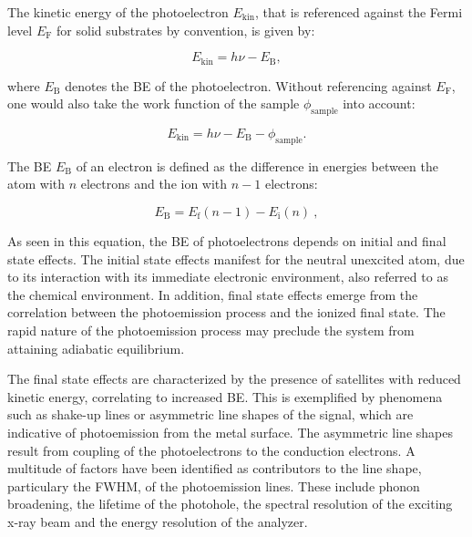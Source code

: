 The kinetic energy of the photoelectron $E_\mathrm{kin}$, that is referenced against the Fermi level $E_\mathrm{F}$ for solid substrates by convention, is given by\autocite{Woodruff2016, Briggs1990}:

\begin{equation}
    \label{eq:KineticEnergy1}
    E_\mathrm{kin} = h\nu - E_\mathrm{B},
\end{equation}

where $E_\mathrm{B}$ denotes the \acf{BE} of the photoelectron. Without referencing against $E_\mathrm{F}$, one would also take the work function of the sample $\phi_\mathrm{sample}$ into account:

\begin{equation}
	\label{eq:KineticEnergy2}
	E_\mathrm{kin} = h\nu - E_\mathrm{B}-\phi_\mathrm{sample}.
\end{equation}

 The \ac{BE} $E_\mathrm{B}$ of an electron is defined as the difference in energies between the atom with $n$ electrons and the ion with $n-1$ electrons:

\begin{equation}
    \label{eq:BindingEnergy}
    E_\mathrm{B}=E_\mathrm{f}(n-1)-E_\mathrm{i}(n)~,
\end{equation}


As seen in this equation, the \ac{BE} of photoelectrons depends on initial and final state effects. The initial state effects manifest for the neutral unexcited atom, due to its interaction with its immediate electronic environment, also referred to as the chemical environment. In addition, final state effects emerge from the correlation between the photoemission process and the ionized final state. The rapid nature of the photoemission process may preclude the system from attaining adiabatic equilibrium.\autocite{Woodruff2016}

The final state effects are characterized by the presence of satellites with reduced kinetic energy, correlating to increased \ac{BE}. This is exemplified by phenomena such as shake-up lines or asymmetric line shapes of the signal, which are indicative of photoemission from the metal surface. The asymmetric line shapes result from coupling of the photoelectrons to the conduction electrons.\autocite{Moulder1993}
A multitude of factors have been identified as contributors to the line shape, particulary the \ac{FWHM}, of the photoemission lines. These include phonon broadening, the lifetime of the photohole, the spectral resolution of the exciting x-ray beam and the energy resolution of the analyzer.\autocite{Moulder1993,Fairley2021}

\cleardoublepage